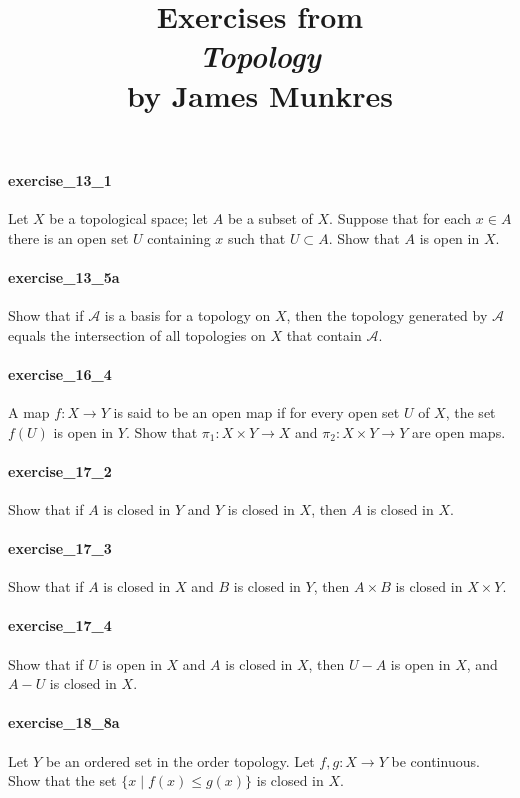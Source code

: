 \documentclass{article}
\title{\textbf{
Exercises from \\
\textit{Topology} \\
by James Munkres
}}
\date{}
\begin{document}
\maketitle

\paragraph{exercise\_13\_1}
Let $X$ be a topological space; let $A$ be a subset of $X$. Suppose that for
each $x \in A$
there is an open set $U$ containing $x$ such that $U \subset A$. Show that $A$
is open in $X$.

\paragraph{exercise\_13\_5a} Show that if $\mathcal{A}$ is a basis for a topology on $X$, then the topology generated by $\mathcal{A}$ equals the intersection of all topologies on $X$ that contain $\mathcal{A}$.

\paragraph{exercise\_16\_4} A map $f: X \rightarrow Y$ is said to be an open map if for every open set $U$ of $X$, the set $f(U)$ is open in $Y$. Show that $\pi_{1}: X \times Y \rightarrow X$ and $\pi_{2}: X \times Y \rightarrow Y$ are open maps.

\paragraph{exercise\_17\_2} Show that if $A$ is closed in $Y$ and $Y$ is closed in $X$, then $A$ is closed in $X$.

\paragraph{exercise\_17\_3} Show that if $A$ is closed in $X$ and $B$ is closed in $Y$, then $A \times B$ is closed in $X \times Y$.

\paragraph{exercise\_17\_4} Show that if $U$ is open in $X$ and $A$ is closed in $X$, then $U-A$ is open in $X$, and $A-U$ is closed in $X$.

\paragraph{exercise\_18\_8a} Let $Y$ be an ordered set in the order topology. Let $f, g: X \rightarrow Y$ be continuous. Show that the set $\{x \mid f(x) \leq g(x)\}$ is closed in $X$.
\end{document}
